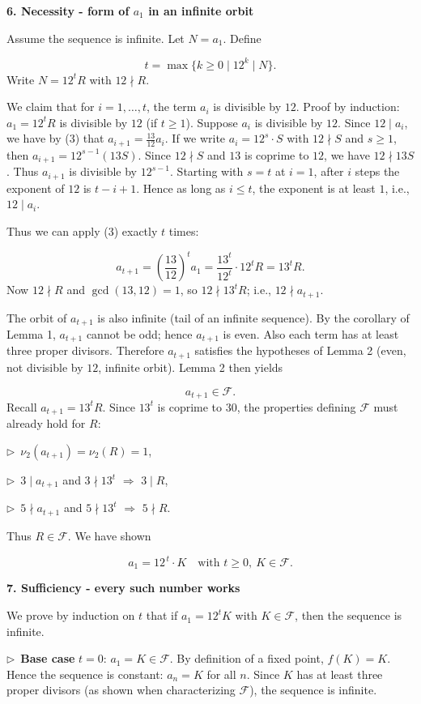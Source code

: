 \documentclass{llmxive}
\providecommand{\solutionheading}[1]{\par\smallskip\noindent\textbf{#1}\par}
\providecommand{\compactbullet}[1]{\par\noindent$\triangleright$~#1\par}
\begin{document}
\smallskip
\solutionheading{6. Necessity - form of \(a_1\) in an infinite orbit}
Assume the sequence is infinite. Let \(N=a_1\). Define\par
\[
t=\max\{k\ge0\mid 12^k\mid N\}.
\]
Write \(N=12^tR\) with \(12\nmid R\).\par
We claim that for \(i=1,\dots,t\), the term \(a_i\) is divisible by \(12\). Proof by induction: \(a_1=12^tR\) is divisible by \(12\) (if \(t\ge1\)). Suppose \(a_i\) is divisible by \(12\). Since \(12\mid a_i\), we have by (3) that \(a_{i+1}=\frac{13}{12}a_i\). If we write \(a_i=12^s\cdot S\) with \(12\nmid S\) and \(s\ge1\), then \(a_{i+1}=12^{s-1}(13S)\). Since \(12\nmid S\) and \(13\) is coprime to \(12\), we have \(12\nmid13S\). Thus \(a_{i+1}\) is divisible by \(12^{s-1}\). Starting with \(s=t\) at \(i=1\), after \(i\) steps the exponent of \(12\) is \(t-i+1\). Hence as long as \(i\le t\), the exponent is at least \(1\), i.e., \(12\mid a_i\).\par
Thus we can apply (3) exactly \(t\) times:\par
\[
a_{t+1}=\left(\frac{13}{12}\right)^t a_1 = \frac{13^t}{12^t}\cdot 12^tR = 13^tR.
\]
Now \(12\nmid R\) and \(\gcd(13,12)=1\), so \(12\nmid 13^tR\); i.e., \(12\nmid a_{t+1}\).\par
The orbit of \(a_{t+1}\) is also infinite (tail of an infinite sequence). By the corollary of Lemma 1, \(a_{t+1}\) cannot be odd; hence \(a_{t+1}\) is even. Also each term has at least three proper divisors. Therefore \(a_{t+1}\) satisfies the hypotheses of Lemma 2 (even, not divisible by \(12\), infinite orbit). Lemma 2 then yields\par
\[
a_{t+1}\in\mathcal{F}.
\]
Recall \(a_{t+1}=13^tR\). Since \(13^t\) is coprime to \(30\), the properties defining \(\mathcal{F}\) must already hold for \(R\):\par
\compactbullet{\(\nu_2(a_{t+1})=\nu_2(R)=1\),}
\compactbullet{\(3\mid a_{t+1}\) and \(3\nmid13^t\) $\Rightarrow$ \(3\mid R\),}
\compactbullet{\(5\nmid a_{t+1}\) and \(5\nmid13^t\) $\Rightarrow$ \(5\nmid R\).}
Thus \(R\in\mathcal{F}\). We have shown\par
\[
\boxed{a_1=12^{\,t}\cdot K\quad\text{with }t\ge0,\ K\in\mathcal{F}}.
\]
\smallskip
\solutionheading{7. Sufficiency - every such number works}
We prove by induction on \(t\) that if \(a_1=12^tK\) with \(K\in\mathcal{F}\), then the sequence is infinite.\par
\compactbullet{\textbf{Base case }\(t=0\):\textbf{ }\(a_1=K\in\mathcal{F}\). By definition of a fixed point, \(f(K)=K\). Hence the sequence is constant: \(a_n=K\) for all \(n\). Since \(K\) has at least three proper divisors (as shown when characterizing \(\mathcal{F}\)), the sequence is infinite.}
\end{document}
